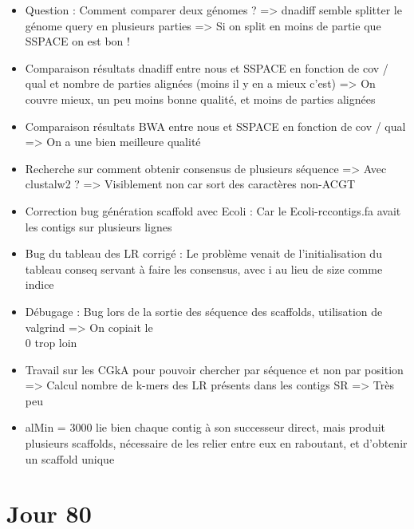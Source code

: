 \documentclass[12pt]{report}
\begin{document}
\begin{itemize}
	\item Question : Comment comparer deux génomes ? => dnadiff semble splitter le génome query en plusieurs parties
		  => Si on split en moins de partie que SSPACE on est bon !
		  
	\item Comparaison résultats dnadiff entre nous et SSPACE en fonction de cov / qual et nombre de parties alignées (moins il y en a mieux c'est)
		  => On couvre mieux, un peu moins bonne qualité, et moins de parties alignées
	
	\item Comparaison résultats BWA entre nous et SSPACE en fonction de cov / qual
		  => On a une bien meilleure qualité
		  
	\item Recherche sur comment obtenir consensus de plusieurs séquence => Avec clustalw2 ? => Visiblement non car sort des caractères non-ACGT
	
	\item Correction bug génération scaffold avec Ecoli : Car le Ecoli-rccontigs.fa avait les contigs sur plusieurs lignes
	
	\item Bug du tableau des LR corrigé : Le problème venait de l'initialisation du tableau conseq servant à faire les consensus, avec i au lieu de size
		  comme indice
		  
	\item Débugage : Bug lors de la sortie des séquence des scaffolds, utilisation de valgrind => On copiait le \\0 trop loin
	
	\item Travail sur les CGkA pour pouvoir chercher par séquence et non par position => Calcul nombre de k-mers des LR
		  présents dans les contigs SR => Très peu
		  
	\item alMin = 3000 lie bien chaque contig à son successeur direct, mais produit plusieurs scaffolds, nécessaire de les relier entre eux
		  en raboutant, et d'obtenir un scaffold unique
\end{itemize}

\section{Jour 80}
\end{document}
